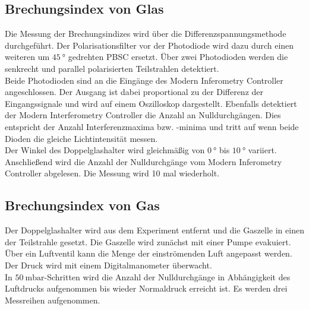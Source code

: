 \subsection{Brechungsindex von Glas}
Die Messung der Brechungsindizes wird über die Differenzspannungsmethode durchgeführt.
Der Polarisationsfilter vor der Photodiode wird dazu durch einen weiteren um $\qty{45}{\degree}$ gedrehten PBSC ersetzt.
Über zwei Photodioden werden die senkrecht und parallel polarisierten Teilstrahlen detektiert.
\\
Beide Photodioden sind an die Eingänge des Modern Inferometry Controller angeschlossen.
Der Ausgang ist dabei proportional zu der Differenz der Eingangssignale und wird auf einem Oszilloskop dargestellt.
Ebenfalls detektiert der Modern Interferometry Controller die Anzahl an Nulldurchgängen.
Dies entspricht der Anzahl Interferenzmaxima bzw. -minima und tritt auf wenn beide Dioden die gleiche Lichtintensität messen.
\\
Der Winkel des Doppelglashalter wird gleichmäßig von $\qty{0}{\degree}$ bis $\qty{10}{\degree}$ variiert.
Anschließend wird die Anzahl der Nulldurchgänge vom Modern Inferometry Controller abgelesen.
Die Messung wird 10 mal wiederholt.

\subsection{Brechungsindex von Gas}
Der Doppelglashalter wird aus dem Experiment entfernt und die Gaszelle in einen der Teilstrahle gesetzt.
Die Gaszelle wird zunächst mit einer Pumpe evakuiert.
Über ein Luftventil kann die Menge der einströmenden Luft angepasst werden.
Der Druck wird mit einem Digitalmanometer überwacht.
\\
In $\qty{50}{\milli\bar}$-Schritten wird die Anzahl der Nulldurchgänge in Abhängigkeit des Luftdrucks aufgenommen bis wieder Normaldruck erreicht ist.
Es werden drei Messreihen aufgenommen.